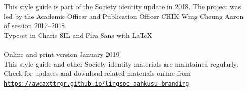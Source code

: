 \documentclass[11pt,a4paper]{book}
\begin{document}
				
				
				
				
				
				
				
				
				
				
				
				
				
				
				
				
			\backmatter
			\thispagestyle{empty}
			\noindent
			This style guide is part of the Society identity update in 2018. The project was led by the Academic Officer and Publication Officer CHIK Wing Cheung Aaron of session 2017--2018.\\
			
			\noindent
			Typeset in Charis SIL and {\firasans Fira Sans} with {\selectfont \LaTeX}
			\\\\
			
			\noindent
			Online and print version January 2019\\
			
			
			
			
			
			\noindent
			This style guide and other Society identity materials are maintained regularly.\\
			Check for updates and download related materials online from \texttt{\url{https://awcaxttrgr.github.io/lingsoc_aahkusu-branding}}
			
				
			\clearpage
			\newpage
				
\end{document}
